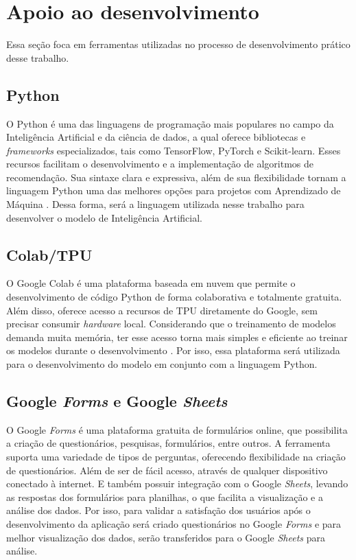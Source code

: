 \section{Apoio ao desenvolvimento}\label{sec:apoiodev}
Essa seção foca em ferramentas utilizadas no processo de desenvolvimento prático desse trabalho.

\subsection{Python}\label{subsec:python}
O Python é uma das linguagens de programação mais populares no campo da Inteligência Artificial e da ciência de dados, a 
qual oferece bibliotecas e \textit{frameworks} especializados, tais como TensorFlow, PyTorch e Scikit-learn. Esses recursos
facilitam o 
desenvolvimento e a implementação de algoritmos de recomendação. Sua sintaxe clara e expressiva, além de sua flexibilidade 
tornam a linguagem Python uma das melhores opções para projetos com Aprendizado de Máquina \cite{pythonsite}. Dessa forma,
será a linguagem utilizada nesse trabalho para desenvolver o modelo de Inteligência Artificial.

\subsection{Colab/TPU}\label{subsec:colab}
O Google Colab é uma plataforma baseada em nuvem que permite o desenvolvimento de código Python de forma colaborativa 
e totalmente gratuita. Além disso, oferece acesso a recursos de TPU diretamente do Google, sem precisar consumir 
\textit{hardware} local. Considerando que o treinamento de modelos demanda muita memória, ter esse acesso torna mais 
simples e eficiente ao treinar os modelos durante o desenvolvimento \cite{colabsite}. Por isso, essa plataforma será utilizada
para o desenvolvimento do modelo em conjunto com a linguagem Python.

\subsection{Google \textit{Forms} e Google \textit{Sheets}}\label{subsec:forms}
O Google \textit{Forms} é uma plataforma gratuita de formulários online, que possibilita a criação de questionários, pesquisas, formulários, 
entre outros. A ferramenta suporta uma variedade de tipos de perguntas, oferecendo flexibilidade na criação de questionários.
Além de ser de fácil acesso, através de qualquer dispositivo conectado à internet. E também possuir integração com o Google 
\textit{Sheets}, levando as respostas dos formulários para planilhas, o que facilita a visualização e a análise dos dados. 
Por isso, para validar a satisfação dos usuários após o desenvolvimento da aplicação será criado questionários no Google 
\textit{Forms} e para melhor visualização dos dados, serão transferidos para o Google \textit{Sheets} para análise.

